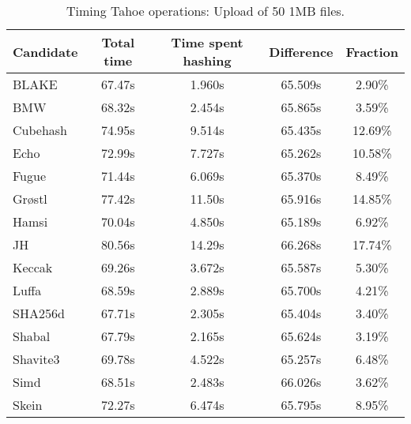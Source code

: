 \begin{table}[h]
  \centering
  \caption{Timing Tahoe operations: Upload of 50 1MB files.}
  \begin{tabular}{ | l | c | c | c | c | }
    \hline
    Candidate & Total time & Time spent hashing & Difference & Fraction \\ \hline
    BLAKE     &  67.47s  &  1.960s  &  65.509s  &  2.90\%   \\  \hline
    BMW       &  68.32s  &  2.454s  &  65.865s  &  3.59\%   \\  \hline
    Cubehash  &  74.95s  &  9.514s  &  65.435s  &  12.69\%  \\  \hline
    Echo      &  72.99s  &  7.727s  &  65.262s  &  10.58\%  \\  \hline
    Fugue     &  71.44s  &  6.069s  &  65.370s  &  8.49\%   \\  \hline
    Grøstl    &  77.42s  &  11.50s  &  65.916s  &  14.85\%  \\  \hline
    Hamsi     &  70.04s  &  4.850s  &  65.189s  &  6.92\%   \\  \hline
    JH        &  80.56s  &  14.29s  &  66.268s  &  17.74\%  \\  \hline
    Keccak    &  69.26s  &  3.672s  &  65.587s  &  5.30\%   \\  \hline
    Luffa     &  68.59s  &  2.889s  &  65.700s  &  4.21\%   \\  \hline
    SHA256d   &  67.71s  &  2.305s  &  65.404s  &  3.40\%   \\  \hline
    Shabal    &  67.79s  &  2.165s  &  65.624s  &  3.19\%   \\  \hline
    Shavite3  &  69.78s  &  4.522s  &  65.257s  &  6.48\%   \\  \hline
    Simd      &  68.51s  &  2.483s  &  66.026s  &  3.62\%   \\  \hline
    Skein     &  72.27s  &  6.474s  &  65.795s  &  8.95\%   \\  \hline
  \end{tabular}
  \label{tbl:hashingtimes:put1mb}
\end{table}

